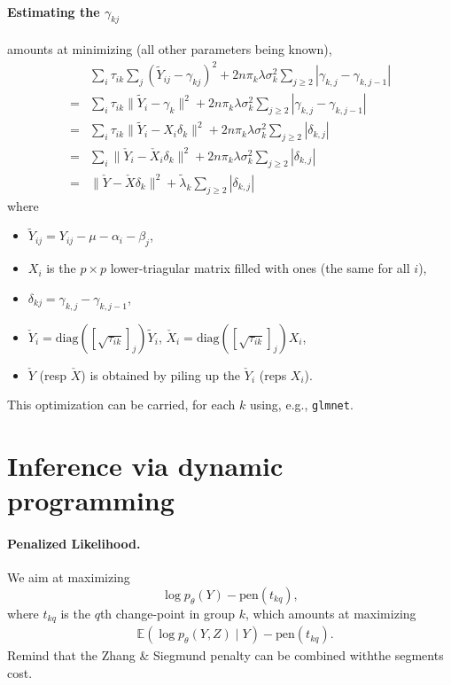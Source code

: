 \documentclass[a4paper, 11pt]{article}
\newcommand{\Esp}{\mathbb{E}}
\newcommand{\lambdat}{\widetilde{\lambda}}
\newcommand{\Xc}{\check{X}}
\newcommand{\Yc}{\check{Y}}
\newcommand{\Yt}{\widetilde{Y}}
\begin{document}
\paragraph{Estimating the $\gamma_{kj}$} amounts at minimizing (all other parameters being known),
\begin{align*}
 & \sum_i \tau_{ik} \sum_j (\Yt_{ij} -\gamma_{kj})^2  + 2 n \pi_k \lambda \sigma^2_k \sum_{j\geq 2} |\gamma_{k,j} - \gamma_{k, j-1}| \\
 = & \sum_i \tau_{ik} \|\Yt_i -\gamma_k\|^2  + 2 n \pi_k \lambda \sigma^2_k \sum_{j\geq 2} |\gamma_{k,j} - \gamma_{k, j-1}| \\
 = & \sum_i \tau_{ik} \|\Yt_i - X_i \delta_k\|^2  + 2 n \pi_k \lambda \sigma^2_k \sum_{j\geq 2} |\delta_{k,j}| \\
 = & \sum_i \|\Yc_i - \Xc_i \delta_k\|^2  + 2 n \pi_k \lambda \sigma^2_k \sum_{j\geq 2} |\delta_{k,j}| \\ 
 = & \|\Yc - \Xc \delta_k\|^2  + \lambdat_k \sum_{j\geq 2} |\delta_{k,j}| 
\end{align*}
where 
\begin{itemize}
 \item $\Yt_{ij} = Y_{ij} - \mu - \alpha_i - \beta_j$,
 \item $X_i$ is the $p \times p$ lower-triagular matrix filled with ones (the same for all $i$), 
 \item $\delta_{kj} = \gamma_{k,j} - \gamma_{k, j-1}$, 
 \item $\Yc_i = \text{diag}([\sqrt{\tau_{ik}}]_j) \Yt_i$, $\Xc_i = \text{diag}([\sqrt{\tau_{ik}}]_j) X_i$,
 \item $\Yc$ (resp $\Xc$) is obtained by piling up the $\Yc_i$ (reps $X_i$).
\end{itemize}
This optimization can be carried, for each $k$ using, e.g., {\tt glmnet}.


\section{Inference via dynamic programming}

\paragraph{Penalized Likelihood.}
We aim at maximizing
$$
\log p_\theta(Y) - \text{pen}(t_{kq}),
$$
where $t_{kq}$ is the $q$th change-point in group $k$, which amounts at maximizing
\begin{align*}
 & \Esp \left(\log p_\theta(Y, Z)  \mid Y\right) - \text{pen}(t_{kq}).
\end{align*}
Remind that the Zhang \& Siegmund penalty can be combined withthe segments cost.
\end{document}
